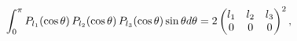 \[\int_{0}^{\pi}\mathop{P_{l_{1}}\/}\nolimits\!\left(\mathop{\cos\/}\nolimits%
\theta\right)\mathop{P_{l_{2}}\/}\nolimits\!\left(\mathop{\cos\/}\nolimits%
\theta\right)\mathop{P_{l_{3}}\/}\nolimits\!\left(\mathop{\cos\/}\nolimits%
\theta\right)\mathop{\sin\/}\nolimits\theta d\theta=2\begin{pmatrix}l_{1}&l_{2%
}&l_{3}\\
0&0&0\end{pmatrix}^{2},\]